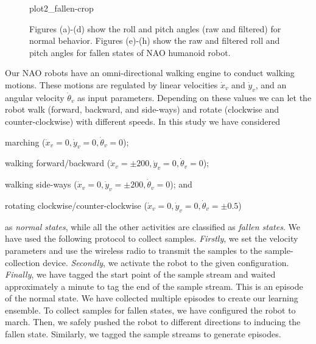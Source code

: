 \documentclass[letterpaper]{article}
\begin{document}
\begin{figure}[!ht]
{       {plot2_fallen-crop}}
  \caption{Figures (a)-(d) show the roll and pitch angles (raw and filtered) for normal 
behavior. Figures (e)-(h) show the raw and filtered roll and pitch angles for fallen 
states of NAO humanoid robot.}
  \label{fig:normalFallenBehavior}

\end{figure}

Our NAO robots have an omni-directional walking engine to conduct walking motions.  
These motions are regulated by linear velocities $\dot{x}_v$ and $\dot{y}_v$, and an 
angular velocity $\dot{\theta}_v$ as input parameters. Depending on these
values we can let the robot walk (forward, backward, and side-ways) and rotate (clockwise and
counter-clockwise) with different speeds. In this study we have considered \begin{inparaenum}[(1)]
\item marching ($\dot{x}_v = 0 , \dot{y}_v = 0, \dot{\theta}_v = 0$); \item walking  
forward/backward ($\dot{x}_v = \pm200
, \dot{y}_v = 0, \dot{\theta}_v = 0$);  \item walking side-ways ($\dot{x}_v = 0, \dot{y}_v = 
\pm200, \dot{\theta}_v = 0$); and  \item rotating clockwise/counter-clockwise
($\dot{x}_v = 0 , \dot{y}_v = 0, \dot{\theta}_v = \pm 0.5$) \end{inparaenum} as {\em normal states}, 
while all the other activities are classified as {\em fallen states}. We have used the  
following protocol to collect samples. \textit{Firstly}, we set the velocity parameters and use the wireless 
radio to transmit the samples to the sample-collection device. \textit{Secondly}, we activate the robot to 
the given configuration. \textit{Finally}, we have tagged the start point of the sample stream and waited 
approximately a minute to tag the end of the sample stream. This is an episode of the normal state. 
We have collected multiple episodes to create our learning ensemble. To collect samples for fallen 
states, we have configured the robot to march. Then, we safely pushed the robot to 
different directions to inducing the fallen state. Similarly, we tagged the sample streams to 
generate episodes.    
\end{document}
